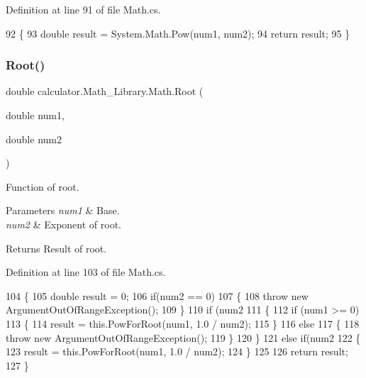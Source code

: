 Definition at line 91 of file Math.\+cs.


\begin{DoxyCode}
92         \{
93             \textcolor{keywordtype}{double} result = System.Math.Pow(num1, num2);
94             \textcolor{keywordflow}{return} result;           
95         \}
\end{DoxyCode}
\mbox{\label{classcalculator_1_1_math___library_1_1_math_a19eaa19ee0c15a18df767dbc08191a35}} 
\subsubsection{Root()}
{\footnotesize\ttfamily double calculator.\+Math\+\_\+\+Library.\+Math.\+Root (\begin{DoxyParamCaption}\item[{double}]{num1,  }\item[{double}]{num2 }\end{DoxyParamCaption})}



Function of root. 


\begin{DoxyParams}{Parameters}
{\em num1} & Base.\\
\hline
{\em num2} & Exponent of root.\\
\hline
\end{DoxyParams}
\begin{DoxyReturn}{Returns}
Result of root.
\end{DoxyReturn}


Definition at line 103 of file Math.\+cs.


\begin{DoxyCode}
104         \{
105             \textcolor{keywordtype}{double} result = 0;
106             \textcolor{keywordflow}{if}(num2 == 0)
107             \{
108                 \textcolor{keywordflow}{throw} \textcolor{keyword}{new} ArgumentOutOfRangeException();
109             \}
110             \textcolor{keywordflow}{if} (num2 %
111             \{
112                 \textcolor{keywordflow}{if} (num1 >= 0)
113                 \{
114                     result = this.PowForRoot(num1, 1.0 / num2);
115                 \}
116                 \textcolor{keywordflow}{else}
117                 \{
118                     \textcolor{keywordflow}{throw} \textcolor{keyword}{new} ArgumentOutOfRangeException();
119                 \}
120             \}
121             \textcolor{keywordflow}{else} \textcolor{keywordflow}{if}(num2 %
122             \{
123                 result = this.PowForRoot(num1, 1.0 / num2);
124             \}
125             
126             \textcolor{keywordflow}{return} result;
127         \}
\end{DoxyCode}
\mbox{\label{classcalculator_1_1_math___library_1_1_math_ad98ea039ae21634fe7df6a25f4b59a34}} 
